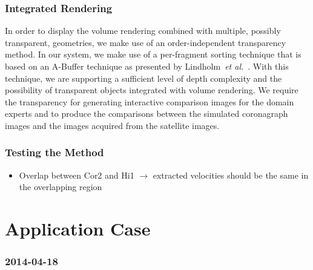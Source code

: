 \documentclass[journal]{vgtc}                %
\def\etal{\textit{et al.}}
\def\etal{\textit{et al.}}
\begin{document}
\subsubsection{Integrated Rendering} \label{sec:integration}
In order to display the volume rendering combined with multiple, possibly transparent, geometries, we make use of an order-independent transparency method. In our system, we make use of a per-fragment sorting technique that is based on an A-Buffer technique as presented by Lindholm~\etal~\cite{Lindholm:2014fm}. With this technique, we are supporting a sufficient level of depth complexity and the possibility of transparent objects integrated with volume rendering. We require the transparency for generating interactive comparison images for the domain experts and to produce the comparisons between the simulated coronagraph images and the images acquired from the satellite images.




\subsubsection{Testing the Method}
\begin{itemize}
\item Overlap between Cor2 and Hi1 $\rightarrow$ extracted velocities should be the same in the overlapping region
\end{itemize}


\section{Application Case}
\subsubsection{2014-04-18}
\end{document}
